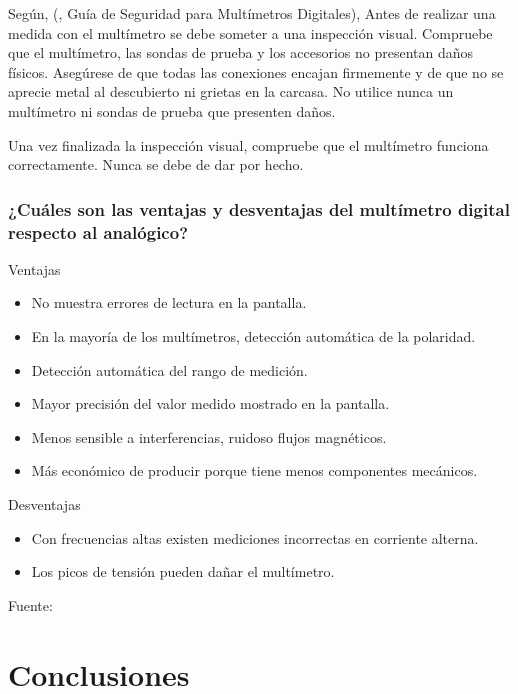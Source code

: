\documentclass[letterpaper, 12pt]{report}
\begin{document}
Según, (\cite{flukeCorporation}, Guía de Seguridad para Multímetros Digitales),
Antes de realizar una medida con el multímetro se debe someter a una inspección
visual. Compruebe que el multímetro, las sondas de prueba y los accesorios no
presentan daños físicos. Asegúrese de que todas las conexiones encajan
firmemente y de que no se aprecie metal al descubierto ni grietas en la carcasa.
No utilice nunca un multímetro ni sondas de prueba que presenten daños.

\vspace{.5cm}

Una vez finalizada la inspección visual, compruebe que el multímetro
funciona correctamente. Nunca se debe de dar por hecho.

\subsubsection{¿Cuáles son las ventajas y desventajas del multímetro digital
	respecto al analógico?}

\begin{center}
	Ventajas
\end{center}

\begin{itemize}
	\item No muestra errores de lectura en la pantalla.
	\item En la mayoría de los multímetros, detección automática de
	      la polaridad.
	\item Detección automática del rango de medición.
	\item Mayor precisión del valor medido mostrado en la pantalla.
	\item Menos sensible a interferencias, ruidoso flujos magnéticos.
	\item Más económico de producir porque tiene menos componentes mecánicos.
\end{itemize}

\vspace{.5cm}

\begin{center}
	Desventajas
\end{center}

\begin{itemize}
	\item Con frecuencias altas existen mediciones incorrectas en corriente
	      alterna.
	\item Los picos de tensión pueden dañar el multímetro.
\end{itemize}

Fuente:~\cite{CesarCinjordiz}

\section{Conclusiones}

\newpage

\end{document}
